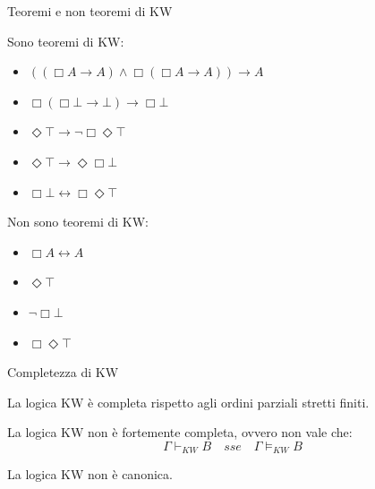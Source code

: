 \documentclass{beamer}
\begin{document}
\begin{frame}{Teoremi e non teoremi di KW}
\begin{exampleblock}{Sono teoremi di KW:}
    \begin{itemize}
        \item $((\Box A \to A) \wedge \Box(\Box A \to A)) \to A$
        \item $\Box(\Box\bot\to\bot)\to\Box\bot$
        \item $\Diamond \top \to \neg\Box\Diamond\top$
        \item $\Diamond \top \to \Diamond\Box\bot$
        \item $\Box\bot\leftrightarrow\Box\Diamond\top$
    \end{itemize}
\end{exampleblock}
\begin{alertblock}{Non sono teoremi di KW:}
    \begin{itemize}
        \item $\Box A \leftrightarrow A$
        \item $\Diamond\top$
        \item $\neg\Box\bot$
        \item $\Box\Diamond\top$
    \end{itemize}
\end{alertblock}

\end{frame}





\begin{frame}{Completezza di KW}
\begin{teorema}
La logica KW è completa rispetto agli ordini parziali stretti finiti.
\end{teorema}
\begin{teorema}
La logica KW non è fortemente completa, ovvero non vale che:
\[
\Gamma \vdash_{KW} B\quad sse\quad \Gamma \models_{KW} B
\]
\end{teorema}
\begin{teorema}
La logica KW non è canonica.
\end{teorema}
\end{frame}
\end{document}
